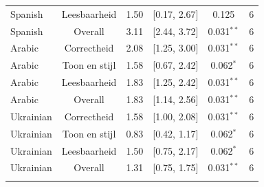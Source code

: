 \begin{table}[htbp]
\begin{tabular}{@{}l c c c c c@{}}
Spanish & Leesbaarheid & 1.50 & [0.17, 2.67] & 0.125 & 6 \\
Spanish & Overall & 3.11 & [2.44, 3.72] & 0.031$^{**}$ & 6 \\
\addlinespace[2pt]
Arabic & Correctheid & 2.08 & [1.25, 3.00] & 0.031$^{**}$ & 6 \\
Arabic & Toon en stijl & 1.58 & [0.67, 2.42] & 0.062$^{*}$ & 6 \\
Arabic & Leesbaarheid & 1.83 & [1.25, 2.42] & 0.031$^{**}$ & 6 \\
Arabic & Overall & 1.83 & [1.14, 2.56] & 0.031$^{**}$ & 6 \\
\addlinespace[2pt]
Ukrainian & Correctheid & 1.58 & [1.00, 2.08] & 0.031$^{**}$ & 6 \\
Ukrainian & Toon en stijl & 0.83 & [0.42, 1.17] & 0.062$^{*}$ & 6 \\
Ukrainian & Leesbaarheid & 1.50 & [0.75, 2.17] & 0.062$^{*}$ & 6 \\
Ukrainian & Overall & 1.31 & [0.75, 1.75] & 0.031$^{**}$ & 6 \\
\addlinespace[2pt]
\bottomrule
\end{tabular}
\end{table}
